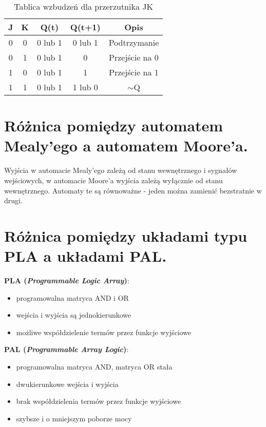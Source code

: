 \documentclass[12pt,a4paper]{article}
\begin{document}
	\begin{table}[!h]
		\centering
		\begin{tabular}{|c|c|c|c|c|}
			\hline
			\textbf{J} & \textbf{K} & \textbf{Q(t)} & \textbf{Q(t+1)} & \textbf{Opis}  \\ \hline
			0          & 0          & 0 lub 1       & 0 lub 1         & Podtrzymanie   \\ \hline
			0          & 1          & 0 lub 1       & 0               & Przejście na 0 \\ \hline
			1          & 0          & 0 lub 1       & 1               & Przejście na 1 \\ \hline
			1          & 1          & 0 lub 1       & 1 lub 0         & $\sim$Q        \\ \hline
		\end{tabular}
		\caption{Tablica wzbudzeń dla przerzutnika JK}
	\end{table}

	\section{Różnica pomiędzy automatem Mealy'ego a automatem Moore'a.}
	Wyjścia w automacie Mealy'ego zależą od stanu wewnętrznego i sygnałów wejściowych, w automacie Moore'a wyjścia zależą wyłącznie od stanu wewnętrznego. Automaty te są równoważne - jeden można zamienić bezstratnie w drugi.

	\section{Różnica pomiędzy układami typu PLA a układami PAL.}
	\textbf{PLA (\textit{Programmable Logic Array})}:
	\begin{itemize}
		\item programowalna matryca AND i OR
		\item wejścia i wyjścia są jednokierunkowe
		\item możliwe współdzielenie termów przez funkcje wyjściowe
	\end{itemize}
	
\textbf{PAL (\textit{Programmable Array Logic})}:
	\begin{itemize}
		\item programowalna matryca AND, matryca OR stała
		\item dwukierunkowe wejścia i wyjścia
		\item brak współdzielenia termów przez funkcje wyjściowe
		\item szybsze i o mniejszym poborze mocy
	\end{itemize}
\end{document}
